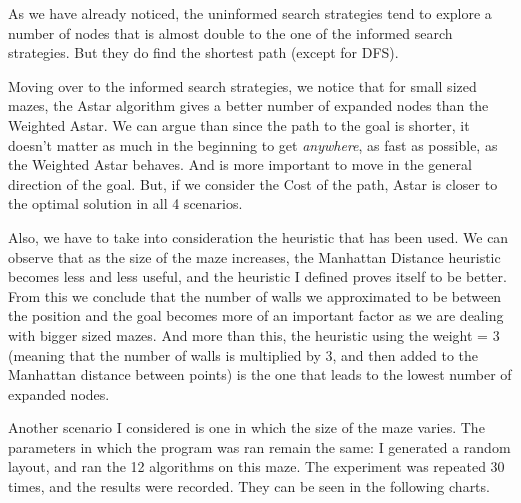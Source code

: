 \documentclass[a4paper,12pt]{report}
\begin{document}
As we have already noticed, the uninformed search strategies tend to explore a number of nodes that is almost double to the one of the informed search strategies. But they do find the shortest path (except for DFS).

Moving over to the informed search strategies, we notice that for small sized mazes, the Astar algorithm gives a better number of expanded nodes than the Weighted Astar. We can argue than since the path to the goal is shorter, it doesn't matter as much in the beginning to get \textit{anywhere}, as fast as possible, as the Weighted Astar behaves. And is more important to move in the general direction of the goal. But, if we consider the Cost of the path, Astar is closer to the optimal solution in all 4 scenarios. 

Also, we have to take into consideration the heuristic that has been used. We can observe that as the size of the maze increases, the Manhattan Distance heuristic becomes less and less useful, and the heuristic I defined proves itself to be better. From this we conclude that the number of walls we approximated to be between the position and the goal becomes more of an important factor as we are dealing with bigger sized mazes. And more than this, the heuristic using the weight = 3 (meaning that the number of walls is multiplied by 3, and then added to the Manhattan distance between points) is the one that leads to the lowest number of expanded nodes.

Another scenario I considered is one in which the size of the maze varies. The parameters in which the program was ran remain the same: I generated a random layout, and ran the 12 algorithms on this maze. The experiment was repeated 30 times, and the results were recorded. They can be seen in the following charts.
\end{document}
